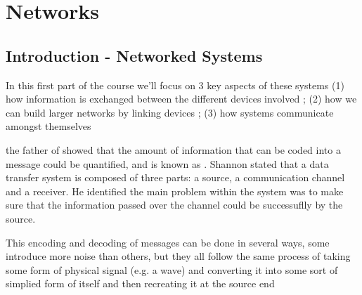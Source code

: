 \section{Networks}

\subsection{Introduction - Networked Systems}


	\par{In this first part of the course we'll focus on 3 key aspects of these systems (1) how information is exchanged between the different devices involved ; (2) how we can build larger networks by linking devices ; (3) how systems communicate amongst themselves}





	\par{ the father of  showed that the amount of information that can be coded into a message could be quantified, and is known as . Shannon stated that a data transfer system is composed of three parts: a source, a communication channel and a receiver. He identified the main problem within the system was to make sure that the information passed over the channel could be successuflly  by the source.}

	\par{This encoding and decoding of messages can be done in several ways, some introduce more noise than others, but they all follow the same process of taking some form of physical signal (e.g. a wave) and converting it into some sort of simplied form of itself and then recreating it at the source end}



